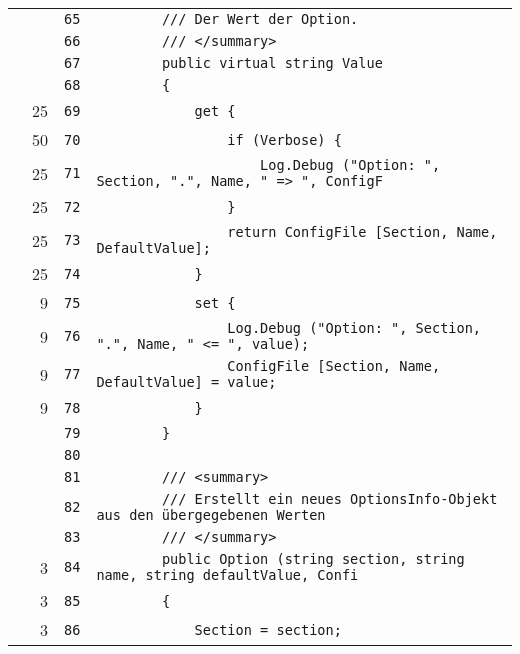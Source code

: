 \documentclass[a4paper,10pt]{article}
\begin{document}
\begin{longtable}[l]{lrrl}
\cellcolor{gray} &  & \verb~65~ & \verb~        /// Der Wert der Option.~\\
\cellcolor{gray} &  & \verb~66~ & \verb~        /// </summary>~\\
\cellcolor{gray} &  & \verb~67~ & \verb~        public virtual string Value~\\
\cellcolor{gray} &  & \verb~68~ & \verb~        {~\\
\cellcolor{green} & 25 & \verb~69~ & \verb~            get {~\\
\cellcolor{green} & 50 & \verb~70~ & \verb~                if (Verbose) {~\\
\cellcolor{green} & 25 & \verb~71~ & \verb~                    Log.Debug ("Option: ", Section, ".", Name, " => ", ConfigF~\\
\cellcolor{green} & 25 & \verb~72~ & \verb~                }~\\
\cellcolor{green} & 25 & \verb~73~ & \verb~                return ConfigFile [Section, Name, DefaultValue];~\\
\cellcolor{green} & 25 & \verb~74~ & \verb~            }~\\
\cellcolor{green} & 9 & \verb~75~ & \verb~            set {~\\
\cellcolor{green} & 9 & \verb~76~ & \verb~                Log.Debug ("Option: ", Section, ".", Name, " <= ", value);~\\
\cellcolor{green} & 9 & \verb~77~ & \verb~                ConfigFile [Section, Name, DefaultValue] = value;~\\
\cellcolor{green} & 9 & \verb~78~ & \verb~            }~\\
\cellcolor{gray} &  & \verb~79~ & \verb~        }~\\
\cellcolor{gray} &  & \verb~80~ & \verb~~\\
\cellcolor{gray} &  & \verb~81~ & \verb~        /// <summary>~\\
\cellcolor{gray} &  & \verb~82~ & \verb~        /// Erstellt ein neues OptionsInfo-Objekt aus den übergegebenen Werten~\\
\cellcolor{gray} &  & \verb~83~ & \verb~        /// </summary>~\\
\cellcolor{green} & 3 & \verb~84~ & \verb~        public Option (string section, string name, string defaultValue, Confi~\\
\cellcolor{green} & 3 & \verb~85~ & \verb~        {~\\
\cellcolor{green} & 3 & \verb~86~ & \verb~            Section = section;~\\

\end{longtable}
\end{document}
